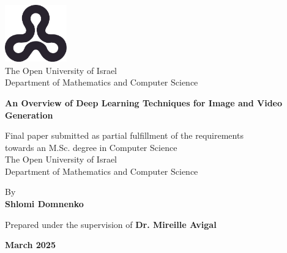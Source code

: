 \begin{titlepage}
    \begin{center}
        \vspace*{1cm}
        
        \includegraphics[width=0.2\textwidth]{images/ou_logo.png}\\
        The Open University of Israel\\
        Department of Mathematics and Computer Science
        
        \vspace{2cm}
        
        {\Large \textbf{An Overview of Deep Learning Techniques for Image and Video Generation}}
        \vspace{1.5cm}
        
        Final paper submitted as partial fulfillment of the requirements\\towards an M.Sc. degree in Computer Science\\
        The Open University of Israel\\
        Department of Mathematics and Computer Science
        
        \vspace{1cm}
        
        By \\
        \textbf{Shlomi Domnenko}
        
        \vspace{1cm}
        
        Prepared under the supervision of \textbf{Dr. Mireille Avigal}
        
        \vfill
        
        \textbf{March 2025}
    \end{center}
\end{titlepage}